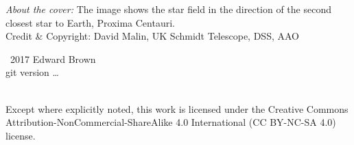 
\maketitle
\newpage
\begin{fullwidth}
\thispagestyle{empty}

\vspace{3\baselineskip}
\noindent \textit{About the cover:} The image shows the star field in the direction of the second closest star to Earth, Proxima Centauri.\\
\noindent Credit \& Copyright: David Malin, UK Schmidt Telescope, DSS, AAO

\vfill
\noindent \ccCopy\ 2017 Edward Brown\\
\noindent git version \ldots

\vspace{3\baselineskip}
\noindent \ccbyncsa \\
\noindent Except where explicitly noted, this work is licensed under the Creative Commons
Attribution-NonCommercial-ShareAlike 4.0 International (CC BY-NC-SA
4.0) license.

\end{fullwidth}

\newpage


\tableofcontents
\listoffigures
\listoftables
\listofexercises
